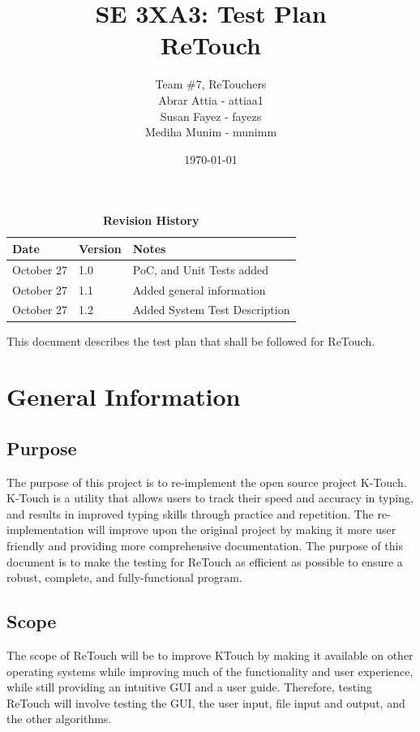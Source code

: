 \documentclass[12pt, titlepage]{article}
\title{SE 3XA3: Test Plan\\ReTouch}
\author{Team \#7, ReTouchers
		\\ Abrar Attia - attiaa1
		\\ Susan Fayez - fayezs
		\\ Mediha Munim - munimm
}
\date{\today}
\begin{document}
\maketitle

\tableofcontents
\listoftables
\listoffigures

\begin{table}[bp]
\caption{\bf Revision History}
\begin{tabularx}{\textwidth}{p{3cm}p{2cm}X}
\toprule {\bf Date} & {\bf Version} & {\bf Notes}\\
\midrule
October 27 & 1.0 & PoC, and Unit Tests added\\
October 27 & 1.1 & Added general information\\
October 27 & 1.2 & Added System Test Description\\
\bottomrule
\end{tabularx}
\end{table}

\newpage


This document describes the test plan that shall be followed for ReTouch.

\section{General Information}

\subsection{Purpose}

	The purpose of this project is to re-implement the open source project K-Touch. K-Touch is a utility that allows users to track their speed and accuracy in typing, and results in improved typing skills through practice and repetition. The re-implementation will improve upon the original project by making it more user friendly and providing more comprehensive documentation. The purpose of this document is to make the testing for ReTouch as efficient as possible to ensure a robust, complete, and fully-functional program.

\subsection{Scope}

	The scope of ReTouch will be to improve KTouch by making it available on other operating systems while improving much of the functionality and user experience, while still providing an intuitive GUI and a user guide. Therefore, testing ReTouch will involve testing the GUI, the user input, file input and output, and the other algorithms. 
\end{document}
